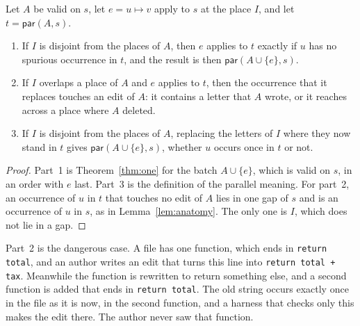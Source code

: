 \documentclass[acmsmall,nonacm,screen]{acmart}
\newcommand{\kw}[1]{\mathsf{#1}}
\newcommand{\str}[1]{\texttt{#1}}
\newcommand{\Par}{\kw{par}}
\newcommand{\claim}[2]{#2}
\begin{document}
\begin{theorem}\label{thm:stale}
Let $A$ be valid on $s$, let $e = u \mapsto v$ apply to $s$ at the place $I$, and let $t =
\Par(A, s)$.
\begin{enumerate}
\item If $I$ is disjoint from the places of $A$, then $e$ applies to $t$ exactly if $u$ has
  no spurious occurrence in $t$, and the result is then $\Par(A \cup \{e\}, s)$.
\item If $I$ overlaps a place of $A$ and $e$ applies to $t$, then the occurrence that it
  replaces touches an edit of $A$: it contains a letter that $A$ wrote, or it reaches across
  a place where $A$ deleted.
\item If $I$ is disjoint from the places of $A$, replacing the letters of $I$ where they now
  stand in $t$ gives $\Par(A \cup \{e\}, s)$, whether $u$ occurs once in $t$ or not.
\end{enumerate}
\end{theorem}

\begin{proof}
Part~1 is Theorem~\ref{thm:one} for the batch $A \cup \{e\}$, which is valid on $s$, in an
order with $e$ last. Part~3 is the definition of the parallel meaning. For part~2, an
occurrence of $u$ in $t$ that touches no edit of $A$ lies in one gap of $s$ and is an
occurrence of $u$ in $s$, as in Lemma~\ref{lem:anatomy}. The only one is $I$, which does not
lie in a gap.
\end{proof}

Part~2 is the dangerous case. \claim{wrong-place}{A file has one function, which ends in
\str{return total}, and an author writes an edit that turns this line into \str{return total
+ tax}. Meanwhile the function is rewritten to return something else, and a second function
is added that ends in \str{return total}. The old string occurs exactly once in the file as
it is now, in the second function, and a harness that checks only this makes the edit there.}
The author never saw that function.
\end{document}
